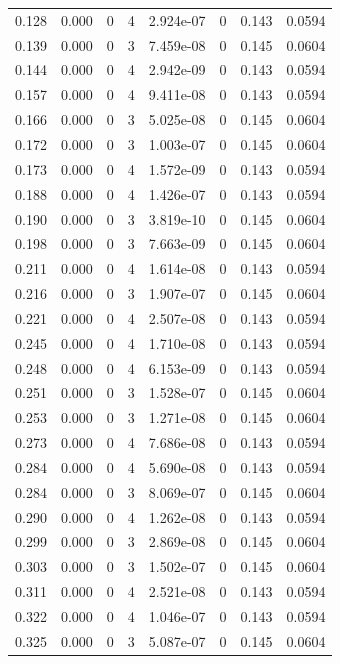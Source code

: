 \documentclass[preview]{standalone}
\begin{document}
{{\begin{tabular}{L{1.2cm}C{1.2cm} C{0.3cm}C{0.5cm} C{1.4cm}C{1.4cm} C{1.4cm}C{1.4cm}}
  0.128  &  0.000  & 0     &  4 &  2.924e-07  & 0  & 0.143 &  0.0594   \\ 
  0.139  &  0.000  & 0     &  3 &  7.459e-08  & 0  & 0.145 &  0.0604   \\ 
  0.144  &  0.000  & 0     &  4 &  2.942e-09  & 0  & 0.143 &  0.0594   \\ 
  0.157  &  0.000  & 0     &  4 &  9.411e-08  & 0  & 0.143 &  0.0594   \\ 
  0.166  &  0.000  & 0     &  3 &  5.025e-08  & 0  & 0.145 &  0.0604   \\ 
  0.172  &  0.000  & 0     &  3 &  1.003e-07  & 0  & 0.145 &  0.0604   \\ 
  0.173  &  0.000  & 0     &  4 &  1.572e-09  & 0  & 0.143 &  0.0594   \\ 
  0.188  &  0.000  & 0     &  4 &  1.426e-07  & 0  & 0.143 &  0.0594   \\ 
  0.190  &  0.000  & 0     &  3 &  3.819e-10  & 0  & 0.145 &  0.0604   \\ 
  0.198  &  0.000  & 0     &  3 &  7.663e-09  & 0  & 0.145 &  0.0604   \\ 
  0.211  &  0.000  & 0     &  4 &  1.614e-08  & 0  & 0.143 &  0.0594   \\ 
  0.216  &  0.000  & 0     &  3 &  1.907e-07  & 0  & 0.145 &  0.0604   \\ 
  0.221  &  0.000  & 0     &  4 &  2.507e-08  & 0  & 0.143 &  0.0594   \\ 
  0.245  &  0.000  & 0     &  4 &  1.710e-08  & 0  & 0.143 &  0.0594   \\ 
  0.248  &  0.000  & 0     &  4 &  6.153e-09  & 0  & 0.143 &  0.0594   \\ 
  0.251  &  0.000  & 0     &  3 &  1.528e-07  & 0  & 0.145 &  0.0604   \\ 
  0.253  &  0.000  & 0     &  3 &  1.271e-08  & 0  & 0.145 &  0.0604   \\ 
  0.273  &  0.000  & 0     &  4 &  7.686e-08  & 0  & 0.143 &  0.0594   \\ 
  0.284  &  0.000  & 0     &  4 &  5.690e-08  & 0  & 0.143 &  0.0594   \\ 
  0.284  &  0.000  & 0     &  3 &  8.069e-07  & 0  & 0.145 &  0.0604   \\ 
  0.290  &  0.000  & 0     &  4 &  1.262e-08  & 0  & 0.143 &  0.0594   \\ 
  0.299  &  0.000  & 0     &  3 &  2.869e-08  & 0  & 0.145 &  0.0604   \\ 
  0.303  &  0.000  & 0     &  3 &  1.502e-07  & 0  & 0.145 &  0.0604   \\ 
  0.311  &  0.000  & 0     &  4 &  2.521e-08  & 0  & 0.143 &  0.0594   \\ 
  0.322  &  0.000  & 0     &  4 &  1.046e-07  & 0  & 0.143 &  0.0594   \\ 
  0.325  &  0.000  & 0     &  3 &  5.087e-07  & 0  & 0.145 &  0.0604   \\ 
\hline 
\end{tabular} 

}}
\end{document}
